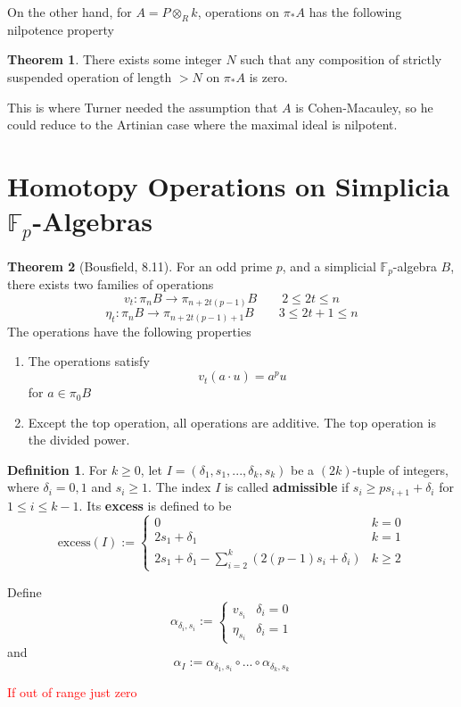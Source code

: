 \documentclass{article}
\theoremstyle{definition}
\newtheorem{theorem}{Theorem}[section]
\theoremstyle{definition}
\newtheorem{definition}{Definition}[theorem]
\theoremstyle{definition}
\theoremstyle{definition}
\theoremstyle{definition}
\theoremstyle{definition}
\theoremstyle{definition}
\theoremstyle{definition}
\begin{document}
On the other hand, for $A= P\otimes_R k$, operations on $\pi_* A$ has the following nilpotence property
\begin{theorem}
  There exists some integer $N$ such that any composition of strictly suspended operation of length $>N$ on $\pi_* A$ is zero. 
\end{theorem}
This is where Turner needed the assumption that $A$ is Cohen-Macauley, so he could reduce to the Artinian case where the maximal ideal is nilpotent.




\section{\texorpdfstring{Homotopy Operations on Simplicia $\mathbb{F}_p$-Algebras }{} }

\begin{theorem}[Bousfield, 8.11]
    For an odd prime $p$, and a simplicial $\mathbb{F}_p$-algebra $B$, there exists two families of operations 
    \[v_t: \pi_n B\to \pi_{n+2t(p-1)}B \quad \quad 2\leq 2t\leq n \]
    \[\eta_t: \pi_n B\to \pi_{n+2t(p-1)+1}B \quad \quad 3\leq 2t+1\leq n \]
The operations have the following properties 
\begin{enumerate}
    \item The operations satisfy
    \[v_t(a\cdot u)=a^p u\] 
    for $a\in \pi_0B$
    \item Except the top operation, all operations are additive. The top operation is the divided power. 
\end{enumerate}








\end{theorem}

\begin{definition}
    For $k\geq 0$, let $I=(\delta_1,s_1,...,\delta_k,s_k)$ be a $(2k)$-tuple of integers, where $\delta_i =0,1$ and $s_i\geq 1$. The index $I$ is called \textbf{admissible} if $s_{i}\geq ps_{i+1}+ \delta_i$ for $1\leq i\leq k-1$.  Its \textbf{excess} is defined to be 
    \[\textrm{excess}(I):=\begin{cases}
        0 & k=0 \\
        2s_1+\delta_1 & k=1 \\
        2s_1+\delta_1 - \sum^k_{i=2}(2(p-1)s_i+\delta_i) & k\geq 2
    \end{cases}
    \]
    
    
    
    
    Define 
    \[\alpha_{\delta_i,s_i}:=\begin{cases}
        v_{s_i} & \delta_i =0\\
        \eta_{s_i} & \delta_i=1
    \end{cases}\]
    and 
    \[\alpha_I:= \alpha_{\delta_1,s_i}\circ ...\circ \alpha_{\delta_k,s_k} \]

    \textcolor{red}{If out of range just zero}

\end{definition}
\end{document}
